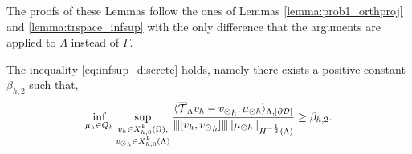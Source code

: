 \documentclass[r]{siamart171218}
\begin{document}
The proofs of these Lemmas follow the ones of Lemmas \ref{lemma:prob1_orthproj} and \ref{lemma:trspace_infsup} with the only difference that the arguments are applied to $\Lambda$ instead of $\Gamma$.

\begin{theorem} 
The inequality \eqref{eq:infsup_discrete} holds, 
namely there exists a positive constant $\beta_{h,2}$ such that,
\begin{equation}
\inf_{\mu_h \in Q_h} 
\sup_{\substack{v_h \in X_{h,0}^k(\Omega),\\ {v_{\odot}}_h \in X_{h,0}^k(\Lambda)} }\frac{\langle {\overline{\mathcal{T}}_\Lambda} v_h -  {v_{\odot}}_h, \mu_{\odot h} \rangle _{\Lambda,|\partial\mathcal{D}|} } {{\left\vert\kern-0.25ex\left\vert\kern-0.25ex\left\vert [v_h, {v_{\odot}}_h] \right\vert\kern-0.25ex\right\vert\kern-0.25ex\right\vert} \|\mu_{\odot h}\|_{H^{-\frac 12 }(\Lambda)} } 
\geq \beta_{h,2}. 
\end{equation}
\end{theorem}
\end{document}
